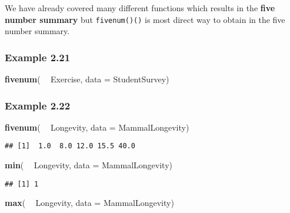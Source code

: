 \documentclass[]{book}
\newenvironment{Shaded}{\begin{snugshade}}{\end{snugshade}}
\newcommand{\DataTypeTok}[1]{\textcolor[rgb]{0.13,0.29,0.53}{#1}}
\newcommand{\KeywordTok}[1]{\textcolor[rgb]{0.13,0.29,0.53}{\textbf{#1}}}
\newcommand{\NormalTok}[1]{#1}
\newcommand{\OperatorTok}[1]{\textcolor[rgb]{0.81,0.36,0.00}{\textbf{#1}}}
\newcommand{\StringTok}[1]{\textcolor[rgb]{0.31,0.60,0.02}{#1}}
\begin{document}
We have already covered many different functions which results in the \textbf{five number summary} but \texttt{fivenum()()} is most direct way to obtain in the five number summary.

\hypertarget{example-2.21}{%
\subsubsection{Example 2.21}\label{example-2.21}}

\begin{Shaded}
\begin{Highlighting}[]
\KeywordTok{fivenum}\NormalTok{( }\OperatorTok{~}\StringTok{ }\NormalTok{Exercise, }\DataTypeTok{data =}\NormalTok{ StudentSurvey)}
\end{Highlighting}
\end{Shaded}

\hypertarget{example-2.22}{%
\subsubsection{Example 2.22}\label{example-2.22}}

\begin{Shaded}
\begin{Highlighting}[]
\KeywordTok{fivenum}\NormalTok{( }\OperatorTok{~}\StringTok{ }\NormalTok{Longevity, }\DataTypeTok{data =}\NormalTok{ MammalLongevity)}
\end{Highlighting}
\end{Shaded}

\begin{verbatim}
## [1]  1.0  8.0 12.0 15.5 40.0
\end{verbatim}

\begin{Shaded}
\begin{Highlighting}[]
\KeywordTok{min}\NormalTok{( }\OperatorTok{~}\StringTok{ }\NormalTok{Longevity, }\DataTypeTok{data =}\NormalTok{ MammalLongevity) }
\end{Highlighting}
\end{Shaded}

\begin{verbatim}
## [1] 1
\end{verbatim}

\begin{Shaded}
\begin{Highlighting}[]
\KeywordTok{max}\NormalTok{( }\OperatorTok{~}\StringTok{ }\NormalTok{Longevity, }\DataTypeTok{data =}\NormalTok{ MammalLongevity) }
\end{Highlighting}
\end{Shaded}
\end{document}
